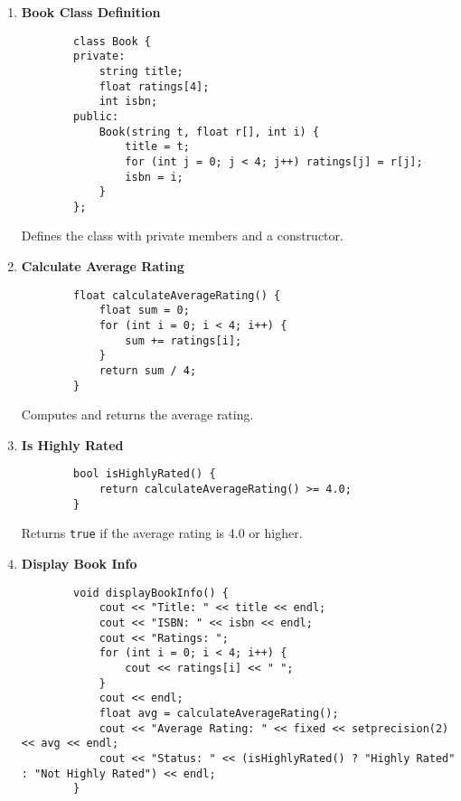 \documentclass[a4paper,12pt]{article}
\begin{document}
\begin{enumerate}
    \item \textbf{Book Class Definition}

    \lstset{language=C++}
    \begin{lstlisting}
        class Book {
        private:
            string title;
            float ratings[4];
            int isbn;
        public:
            Book(string t, float r[], int i) {
                title = t;
                for (int j = 0; j < 4; j++) ratings[j] = r[j];
                isbn = i;
            }
        };
    \end{lstlisting}

    Defines the class with private members and a constructor.

    \item \textbf{Calculate Average Rating}

    \lstset{language=C++}
    \begin{lstlisting}
        float calculateAverageRating() {
            float sum = 0;
            for (int i = 0; i < 4; i++) {
                sum += ratings[i];
            }
            return sum / 4;
        }
    \end{lstlisting}

    Computes and returns the average rating.

    \item \textbf{Is Highly Rated}

    \lstset{language=C++}
    \begin{lstlisting}
        bool isHighlyRated() {
            return calculateAverageRating() >= 4.0;
        }
    \end{lstlisting}

    Returns \verb|true| if the average rating is 4.0 or higher.

    \item \textbf{Display Book Info}

    \lstset{language=C++}
    \begin{lstlisting}
        void displayBookInfo() {
            cout << "Title: " << title << endl;
            cout << "ISBN: " << isbn << endl;
            cout << "Ratings: ";
            for (int i = 0; i < 4; i++) {
                cout << ratings[i] << " ";
            }
            cout << endl;
            float avg = calculateAverageRating();
            cout << "Average Rating: " << fixed << setprecision(2) << avg << endl;
            cout << "Status: " << (isHighlyRated() ? "Highly Rated" : "Not Highly Rated") << endl;
        }
    \end{lstlisting}


\end{enumerate}
\end{document}
